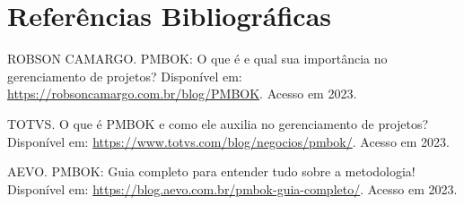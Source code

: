 \documentclass[
	12pt,				%
	openright,			%
	twoside,			%
	a4paper,			%
	english,			%
	brazil				%
	]{abntex2}
\begin{document}
\chapter{Referências Bibliográficas}

\begin{thebibliography}{99}
    
    ROBSON CAMARGO. PMBOK: O que é e qual sua importância no gerenciamento de projetos? Disponível em: \url{https://robsoncamargo.com.br/blog/PMBOK}. Acesso em 2023.

    TOTVS. O que é PMBOK e como ele auxilia no gerenciamento de projetos? Disponível em: \url{https://www.totvs.com/blog/negocios/pmbok/}. Acesso em 2023.

    AEVO. PMBOK: Guia completo para entender tudo sobre a metodologia! Disponível em: \url{https://blog.aevo.com.br/pmbok-guia-completo/}. Acesso em 2023.

\end{thebibliography}

\printindex
\end{document}
